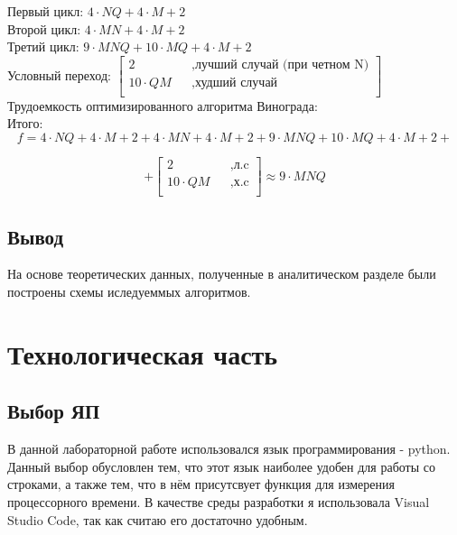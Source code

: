 \documentclass[12pt]{report}
\begin{document}
\begin{enumerate}
	Первый цикл: $4 \cdot N  Q + 4 \cdot M + 2$ \\
	
	Второй цикл: $4 \cdot M  N + 4 \cdot M + 2$\\
	
	Третий цикл: $9 \cdot M  N Q + 10 \cdot M Q + 4 \cdot M + 2$\\
	
	Условный переход: $\begin{bmatrix}
		2   &&, \text{лучший случай (при четном N)}\\
		10 \cdot QM &&, \text{худший случай}\\
	\end{bmatrix} $ \\
	
	Трудоемкость оптимизированного алгоритма Винограда:\\
	
	Итого: $$f = 4 \cdot N  Q + 4 \cdot M + 2 + 4 \cdot M  N + 4 \cdot M + 2 + 9 \cdot M  N Q + 10 \cdot M Q + 4 \cdot M + 2 + $$
	
	$$ + \begin{bmatrix}
		2   &&, \text{л.c}\\
		10 \cdot QM &&, \text{х.c}\\
	\end{bmatrix} \approx 9 \cdot MNQ$$
	
	
\end{enumerate}

\section{Вывод}
	На основе теоретических данных, полученные в аналитическом разделе были построены схемы иследуеммых  алгоритмов.

\chapter{Технологическая часть}

\section{Выбор ЯП}
В данной лабораторной работе использовался язык программирования - python. Данный выбор обусловлен тем, что этот язык наиболее удобен для работы со строками, а также тем, что в нём присутсвует функция для измерения процессорного времени.
В качестве среды разработки я использовала Visual Studio Code, так как считаю его достаточно удобным.
\end{document}
